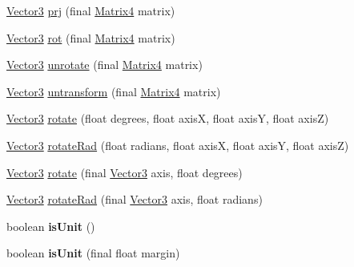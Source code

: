 \begin{DoxyCompactItemize}
\item 
\hyperlink{classairhockeyjava_1_1util_1_1_vector3}{Vector3} \hyperlink{classairhockeyjava_1_1util_1_1_vector3_a97b7ee142408a81b023e4a626de861e9}{prj} (final \hyperlink{classairhockeyjava_1_1util_1_1_matrix4}{Matrix4} matrix)
\item 
\hyperlink{classairhockeyjava_1_1util_1_1_vector3}{Vector3} \hyperlink{classairhockeyjava_1_1util_1_1_vector3_add8a4ada889d65afe702536f7b5d8804}{rot} (final \hyperlink{classairhockeyjava_1_1util_1_1_matrix4}{Matrix4} matrix)
\item 
\hyperlink{classairhockeyjava_1_1util_1_1_vector3}{Vector3} \hyperlink{classairhockeyjava_1_1util_1_1_vector3_a51b002b77d7138ca1d1b8a76e3e15c35}{unrotate} (final \hyperlink{classairhockeyjava_1_1util_1_1_matrix4}{Matrix4} matrix)
\item 
\hyperlink{classairhockeyjava_1_1util_1_1_vector3}{Vector3} \hyperlink{classairhockeyjava_1_1util_1_1_vector3_a30a7bce5c196432902f8537610cba680}{untransform} (final \hyperlink{classairhockeyjava_1_1util_1_1_matrix4}{Matrix4} matrix)
\item 
\hyperlink{classairhockeyjava_1_1util_1_1_vector3}{Vector3} \hyperlink{classairhockeyjava_1_1util_1_1_vector3_af7ff0835b38bc9d0fc93231559470a9d}{rotate} (float degrees, float axis\+X, float axis\+Y, float axis\+Z)
\item 
\hyperlink{classairhockeyjava_1_1util_1_1_vector3}{Vector3} \hyperlink{classairhockeyjava_1_1util_1_1_vector3_a44665531a1718980109bea40cc51c9e0}{rotate\+Rad} (float radians, float axis\+X, float axis\+Y, float axis\+Z)
\item 
\hyperlink{classairhockeyjava_1_1util_1_1_vector3}{Vector3} \hyperlink{classairhockeyjava_1_1util_1_1_vector3_aff67f09f72b91da8d8e55cabce8b71d9}{rotate} (final \hyperlink{classairhockeyjava_1_1util_1_1_vector3}{Vector3} axis, float degrees)
\item 
\hyperlink{classairhockeyjava_1_1util_1_1_vector3}{Vector3} \hyperlink{classairhockeyjava_1_1util_1_1_vector3_aec91807824523c98a3f157a96a79f497}{rotate\+Rad} (final \hyperlink{classairhockeyjava_1_1util_1_1_vector3}{Vector3} axis, float radians)
\item 
\hypertarget{classairhockeyjava_1_1util_1_1_vector3_a53f17684ab71067373e7940bba172b86}{}boolean {\bfseries is\+Unit} ()\label{classairhockeyjava_1_1util_1_1_vector3_a53f17684ab71067373e7940bba172b86}

\item 
\hypertarget{classairhockeyjava_1_1util_1_1_vector3_a617f77c325a0e423e33727f85a4993ce}{}boolean {\bfseries is\+Unit} (final float margin)\label{classairhockeyjava_1_1util_1_1_vector3_a617f77c325a0e423e33727f85a4993ce}


\end{DoxyCompactItemize}
